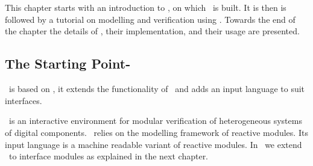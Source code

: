 \chapter{\chai}
This chapter starts with an introduction to {\mocha } \cite{Mo98}, on
which \chai \ is built. It is then is followed by a tutorial on
modelling and verification using {\chai}. Towards the end of the
chapter the details of {\im}, their implementation, and their usage are
presented.

\section{The Starting Point- \mocha} \chai \ is based on {\mocha },
it extends the functionality of \mocha \ and adds an input
language to suit interfaces.

\mocha \ is an interactive environment for modular verification of
heterogeneous systems of digital components.  \mocha \ relies on the
modelling framework of reactive modules. Its input language is a machine
readable variant of reactive modules. In \chai \ we extend \rm \ to
interface modules as explained in the next chapter.



